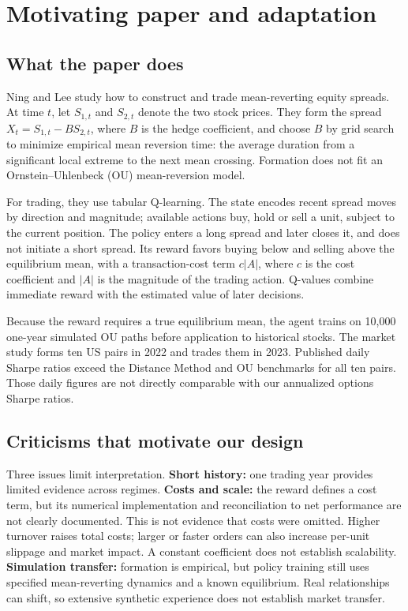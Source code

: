 \documentclass[11pt,letterpaper]{article}
\begin{document}
\clearpage
\section{Motivating paper and adaptation}
\subsection*{What the paper does}
Ning and Lee \cite{ning} study how to construct and trade mean-reverting equity
spreads. At time $t$, let $S_{1,t}$ and $S_{2,t}$ denote the two stock prices.
They form the spread $X_t=S_{1,t}-B S_{2,t}$, where $B$ is the hedge coefficient,
and choose $B$ by grid search to minimize empirical mean reversion time:
the average duration from a significant local extreme to the next mean crossing.
Formation does not fit an Ornstein--Uhlenbeck (OU) mean-reversion model.

For trading, they use tabular Q-learning. The state encodes recent spread moves
by direction and magnitude; available actions buy, hold or sell a unit, subject
to the current position. The policy enters a long spread and later closes it,
and does not initiate a short spread. Its reward favors buying below and
selling above the equilibrium mean, with a transaction-cost term $c|A|$,
where $c$ is the cost coefficient and $|A|$ is the magnitude of the trading action.
Q-values combine immediate reward with the estimated value of later decisions.

Because the reward requires a true equilibrium mean, the agent trains on
10,000 one-year simulated OU paths before application to historical stocks.
The market study forms ten US pairs in 2022 and trades them in 2023. Published
daily Sharpe ratios exceed the Distance Method and OU benchmarks for all ten
pairs. Those daily figures are not directly comparable with our annualized
options Sharpe ratios.

\subsection*{Criticisms that motivate our design}
Three issues limit interpretation. \textbf{Short history:} one trading year
provides limited evidence across regimes. \textbf{Costs and scale:} the reward
defines a cost term, but its numerical implementation and reconciliation to net
performance are not clearly documented. This is not evidence that costs were
omitted. Higher turnover raises total costs; larger or faster orders can also
increase per-unit slippage and market impact. A constant coefficient does not establish scalability. \textbf{Simulation transfer:} formation is empirical,
but policy training still uses specified mean-reverting dynamics and a known
equilibrium. Real relationships can shift, so extensive synthetic experience
does not establish market transfer.
\end{document}
